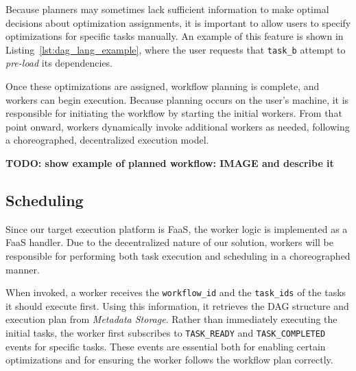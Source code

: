 \documentclass[conference]{IEEEtran}
\begin{document}
Because planners may sometimes lack sufficient information to make optimal decisions about optimization assignments, it is important to allow users to specify optimizations for specific tasks manually. An example of this feature is shown in Listing~\ref{lst:dag_lang_example}, where the user requests that \texttt{task\_b} attempt to \textit{pre-load} its dependencies.

Once these optimizations are assigned, workflow planning is complete, and workers can begin execution. Because planning occurs on the user's machine, it is responsible for initiating the workflow by starting the initial workers. From that point onward, workers dynamically invoke additional workers as needed, following a choreographed, decentralized execution model.

\textbf{TODO: show example of planned workflow: IMAGE and describe it}

\subsection{Scheduling}

Since our target execution platform is FaaS, the worker logic is implemented as a FaaS handler. Due to the decentralized nature of our solution, workers will be responsible for performing both task execution and scheduling in a choreographed manner. 

When invoked, a worker receives the \texttt{workflow\_id} and the \texttt{task\_ids} of the tasks it should execute first. Using this information, it retrieves the DAG structure and execution plan from \textit{Metadata Storage}. Rather than immediately executing the initial tasks, the worker first subscribes to \texttt{TASK\_READY} and \texttt{TASK\_COMPLETED} events for specific tasks. These events are essential both for enabling certain optimizations and for ensuring the worker follows the workflow plan correctly.
\end{document}
